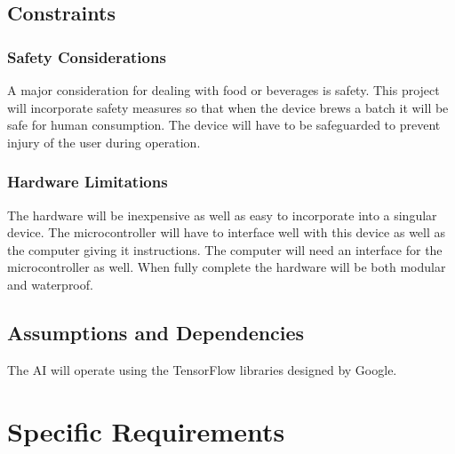 \documentclass[draftclsnofoot,onecolumn,letterpaper,10pt]{IEEEtran}
\begin{document}
\subsection{Constraints}
\subsubsection{Safety Considerations}
A major consideration for dealing with food or beverages is safety.
This project will incorporate safety measures so that when the device brews a batch it will be safe for human consumption.
The device will have to be safeguarded to prevent injury of the user during operation.
\subsubsection{Hardware Limitations}
The hardware will be inexpensive as well as easy to incorporate into a singular device.
The microcontroller will have to interface well with this device as well as the computer giving it instructions.
The computer will need an interface for the microcontroller as well.
When fully complete the hardware will be both modular and waterproof.

\subsection{Assumptions and Dependencies}
The AI will operate using the TensorFlow libraries designed by Google.

\section{Specific Requirements}
\end{document}
